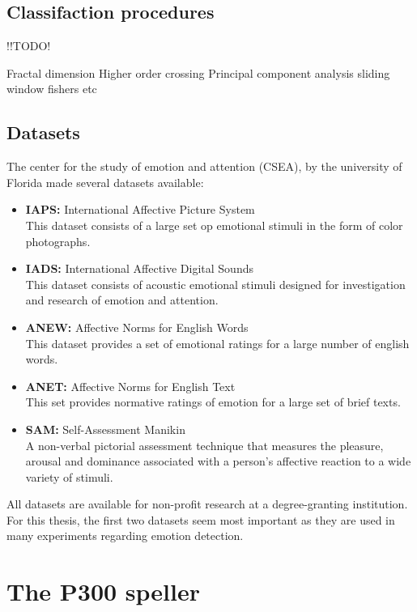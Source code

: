 \subsection{Classifaction procedures}
!!TODO!

Fractal dimension %
Higher order crossing
Principal component analysis
sliding window
fishers
etc


\subsection{Datasets}
The center for the study of emotion and attention (CSEA), by the university of Florida made several datasets available:
\begin{itemize}
\item \textbf{IAPS:} International Affective Picture System\\
This dataset consists of a large set op emotional stimuli in the form of color photographs.
\item \textbf{IADS:} International Affective Digital Sounds \\
This dataset consists of acoustic emotional stimuli designed for investigation and research of emotion and attention.
\item \textbf{ANEW:} Affective Norms for English Words\\
This dataset provides a set of emotional ratings for a large number of english words.
\item \textbf{ANET:} Affective Norms for English Text\\
This set provides normative ratings of emotion for a large set of brief texts.
\item \textbf{SAM:} Self-Assessment Manikin\\
A non-verbal pictorial assessment technique that measures the pleasure, arousal and dominance associated with a person's affective reaction to a wide variety of stimuli.
\end{itemize}
All datasets are available for non-profit research at a degree-granting institution\cite{DataSets}. For this thesis, the first two datasets seem most important as they are used in many experiments regarding emotion detection\cite{ExtendedPaper}\cite{EmotionSite}\cite{RealTimeEEGEmotion}\cite{EEGDatasets}.

\section{The P300 speller}
